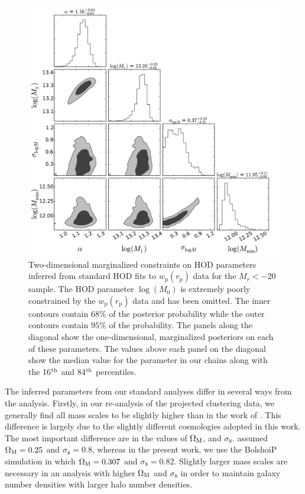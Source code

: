 \documentclass[usenatbib,usegraphicx,letterpaper]{mn2e}
\newcommand{\wprp}{w_{\mathrm{p}}}
\newcommand{\rp}{r_{\mathrm{p}}}
\begin{document}
\begin{figure}
\begin{center}
\includegraphics[width=15.0cm]{Mr20_covar_triangle_1.pdf}
\caption{
Two-dimensional marginalized constraints on HOD parameters inferred from 
standard HOD fits to $\wprp(\rp)$ data for the $M_r<-20$ sample. The HOD parameter 
$\log (M_0)$ is extremely poorly constrained by the $\wprp(\rp)$ data and has been 
omitted. The inner contours contain $68\%$ of the posterior probability while the 
outer contours contain $95\%$ of the probability. The panels along the diagonal 
show the one-dimensional, marginalized posteriors on each of these parameters. 
The values above each panel on the diagonal show the 
median value for the parameter in our chains along with the 
16$^{\rm th}$ and 84$^{\rm th}$ percentiles. 
}
\label{fig:Mr20triangle}
\end{center}
\end{figure}

The inferred parameters from our standard analyses differ in several ways from the \citet{zehavi_etal11} 
analysis. Firstly, in our re-analysis of the projected clustering data, we generally find all mass scales to 
be slightly higher than in the work of \citet{zehavi_etal11}. This difference is largely due to the slightly 
different cosmologies adopted in this work. The most important difference 
are in the values of $\Omega_{\rm M}$, and $\sigma_8$.  
\citet{zehavi_etal11} assumed $\Omega_{\rm M}=0.25$ and $\sigma_8=0.8$, 
whereas in the present work, we use the BolshoiP simulation in which $\Omega_{\rm M}=0.307$ and $\sigma_8=0.82$. 
Slightly larger mass scales are necessary in an analysis with higher $\Omega_{\rm M}$ and $\sigma_8$ in order 
to maintain galaxy number densities with larger halo number densities.
\end{document}
